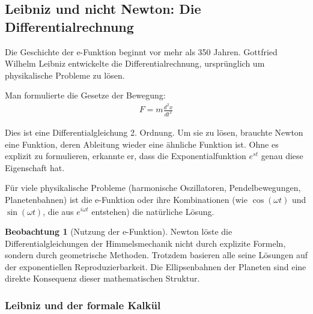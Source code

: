 \documentclass[a4paper,12pt,twoside]{report}
\theoremstyle{definition}
\newtheorem{beobachtung}{Beobachtung}
\begin{document}
\subsection{Leibniz und nicht Newton: Die Differentialrechnung}

Die Geschichte der e-Funktion beginnt vor mehr als 350 Jahren. Gottfried Wilhelm Leibniz entwickelte die Differentialrechnung, ursprünglich um physikalische Probleme zu lösen.

Man formulierte die Gesetze der Bewegung:
\begin{align}
	F = m \frac{d^2 x}{dt^2}
\end{align}

Dies ist eine Differentialgleichung 2. Ordnung. Um sie zu lösen, brauchte Newton eine Funktion, deren Ableitung wieder eine ähnliche Funktion ist. Ohne es explizit zu formulieren, erkannte er, dass die Exponentialfunktion $e^{st}$ genau diese Eigenschaft hat.

Für viele physikalische Probleme (harmonische Oszillatoren, Pendelbewegungen, Planetenbahnen) ist die e-Funktion oder ihre Kombinationen (wie $\cos(\omega t)$ und $\sin(\omega t)$, die aus $e^{i\omega t}$ entstehen) die natürliche Lösung.

\begin{beobachtung}[Nutzung der e-Funktion]
	Newton löste die Differentialgleichungen der Himmelsmechanik nicht durch explizite Formeln, sondern durch geometrische Methoden. Trotzdem basieren alle seine Lösungen auf der exponentiellen Reproduzierbarkeit. Die Ellipsenbahnen der Planeten sind eine direkte Konsequenz dieser mathematischen Struktur.
\end{beobachtung}

\subsubsection*{Leibniz und der formale Kalkül}
\end{document}
